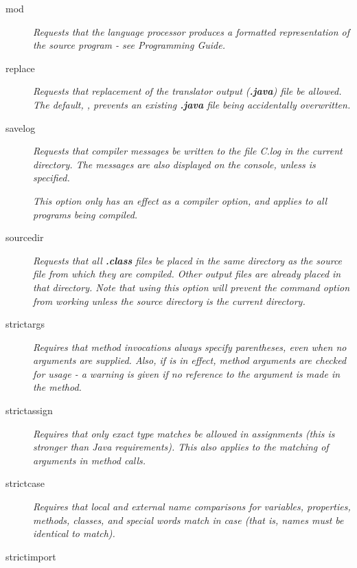 \begin{description}
\item[mod]
\emph{Requests that the language processor produces a formatted
representation of the source program - see Programming Guide.}

\item[replace]
\emph{Requests that replacement of the translator output
(\textbf{.java}) file be allowed.
The default, , prevents an existing \textbf{.java}
file being accidentally overwritten.}
\item[savelog]

\emph{Requests that compiler messages be written to the file \nr{}C.log in
the current directory.
The messages are also displayed on the console, unless
 is specified.}
 
\emph{This option only has an effect as a compiler option, and applies to all
programs being compiled.}
\item[sourcedir]

\emph{Requests that all \textbf{.class} files be placed in the same
directory as the source file from which they are compiled.  Other output
files are already placed in that directory.
Note that using this option will prevent the  command
option from working unless the source directory is the current
directory.}
\item[strictargs]

\emph{Requires that method invocations always specify parentheses, even
when no arguments are supplied.  Also, if  is in
effect, method arguments are checked for usage - a warning is given
if no reference to the argument is made in the method.}
\item[strictassign]
\emph{Requires that only exact type matches be allowed in assignments
(this is stronger than Java requirements).
This also applies to the matching of arguments in method calls.}
\item[strictcase]
\emph{Requires that local and external name comparisons for variables,
properties, methods, classes, and special words match in case (that is,
names must be identical to match).}
\item[strictimport]


\end{description}
